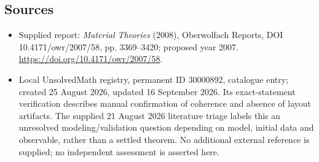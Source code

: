 \documentclass[11pt]{article}
\begin{document}
\subsection{Sources}
\begin{itemize}
\item Supplied report: \emph{Material Theories} (2008), Oberwolfach Reports, DOI 10.4171/owr/2007/58, pp. 3369--3420; proposed year 2007. \url{https://doi.org/10.4171/owr/2007/58}.
\item Local UnsolvedMath registry, permanent ID 30000892, catalogue entry; created 25 August 2026, updated 16 September 2026. Its exact-statement verification describes manual confirmation of coherence and absence of layout artifacts. The supplied 21 August 2026 literature triage labels this an unresolved modeling/validation question depending on model, initial data and observable, rather than a settled theorem. No additional external reference is supplied; no independent assessment is asserted here.
\end{itemize}
\end{document}
